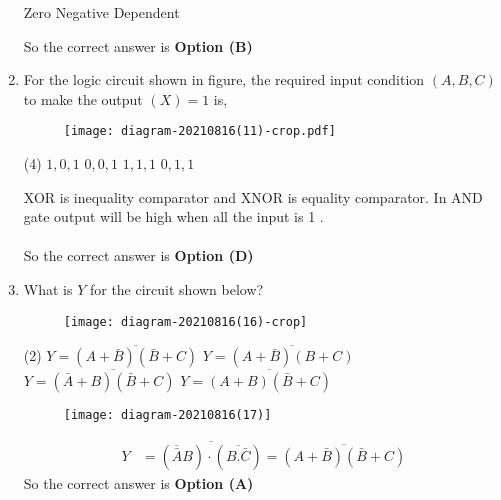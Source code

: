 \begin{enumerate}
\begin{tasks}
		\task[\textbf{B.}] Zero
		\task[\textbf{C.}] Negative
		\task[\textbf{D.}] Dependent
	\end{tasks}
	\begin{answer}
		So the correct answer is \textbf{Option (B)}
	\end{answer}
	\item For the logic circuit shown in figure, the required input condition $(A, B, C)$ to make the output $(X)=1$ is,
	\begin{figure}[H]
		\centering
		\texttt{[image: diagram-20210816(11)-crop.pdf]}
	\end{figure}
	\begin{tasks}(4)
		\task[\textbf{A.}] $1,0,1$
		\task[\textbf{B.}] $0,0,1$
		\task[\textbf{C.}] $1,1,1$
		\task[\textbf{D.}] $0,1,1$
	\end{tasks}
	\begin{answer}
		XOR is inequality comparator and XNOR is equality comparator. In AND gate output will be high when all the input is 1 .\\\\
		So the correct answer is \textbf{Option (D)}
	\end{answer}
	\item What is $Y$ for the circuit shown below?
	\begin{figure}[H]
		\centering
		\texttt{[image: diagram-20210816(16)-crop]}
		\caption{}
		\label{}
	\end{figure}
	\begin{tasks}(2)
		\task[\textbf{A.}] $Y=\overline{(A+\bar{B})(\bar{B}+C)}$
		\task[\textbf{B.}]  $Y=\overline{(A+\bar{B})(B+C)}$
		\task[\textbf{C.}] $Y=\overline{(\bar{A}+B)(\bar{B}+C)}$
		\task[\textbf{D.}] $Y=\overline{(A+B)(\bar{B}+C)}$
	\end{tasks}
	\begin{answer}
		\begin{figure}[H]
			\centering
			\texttt{[image: diagram-20210816(17)]}
		\end{figure}
		\begin{align*}
		Y&=\overline{(\overline{\bar{A}} B) \cdot(\overline{B . \bar{C}})}=\overline{(A+\bar{B})(\bar{B}+C)}
		\end{align*}
		So the correct answer is \textbf{Option (A)}
	\end{answer}
	
	
	
	
	
	
	
	
	
	
	
	
	
	
\end{enumerate}